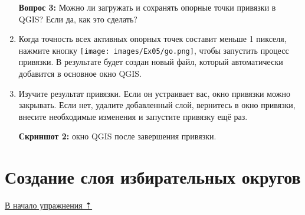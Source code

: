 \documentclass[
  12pt,
]{book}
\begin{document}
\begin{enumerate}
  \textbf{Вопрос 3:} Можно ли загружать и сохранять опорные точки привязки в QGIS? Если да, как это сделать?
\item
  Когда точность всех активных опорных точек составит меньше 1 пикселя, нажмите кнопку \texttt{[image: images/Ex05/go.png]}, чтобы запустить процесс привязки. В результате будет создан новый файл, который автоматически добавится в основное окно QGIS.
\item
  Изучите результат привязки. Если он устраивает вас, окно привязки можно закрывать. Если нет, удалите добавленный слой, вернитесь в окно привязки, внесите необходимые изменения и запустите привязку ещё раз.

  \textbf{Скриншот 2:} окно QGIS после завершения привязки.
\end{enumerate}

\hypertarget{map-ref-districts-creation}{%
\section{Создание слоя избирательных округов}\label{map-ref-districts-creation}}

\protect\hyperlink{map-ref-districts}{В начало упражнения ⇡}
\end{document}
